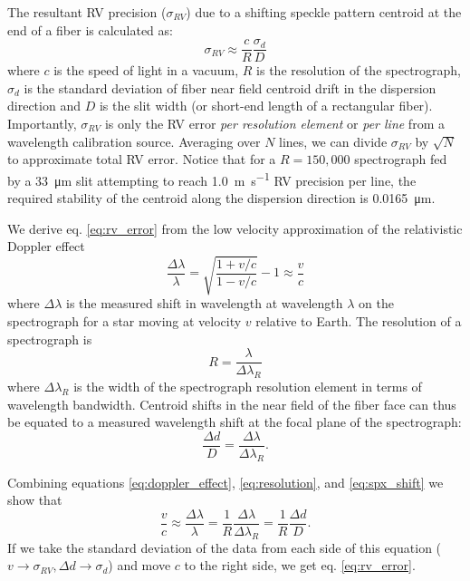 \documentclass[twocolumn]{emulateapj}
\begin{document}
The resultant RV precision ($\sigma_{RV}$) due to a shifting speckle pattern centroid at the end of a fiber is calculated as:
\begin{equation}
\sigma_{RV} \approx \frac{c}{R} \frac{\sigma_d}{D}
\label{eq:rv_error}
\end{equation}
where $c$ is the speed of light in a vacuum, $R$ is the resolution of the spectrograph, $\sigma_d$ is the standard deviation of fiber near field centroid drift in the dispersion direction and $D$ is the slit width (or short-end length of a rectangular fiber). Importantly, $\sigma_{RV}$ is only the RV error \textit{per resolution element} or \textit{per line} from a wavelength calibration source. Averaging over $N$ lines, we can divide $\sigma_{RV}$ by $\sqrt{N}$ to approximate total RV error. Notice that for a $R=150,000$ spectrograph fed by a \SI{33}{\micro\meter} slit attempting to reach \SI{1.0}{\meter\per\second} RV precision per line, the required stability of the centroid along the dispersion direction is \SI{0.0165}{\micro\meter}.

We derive eq. \ref{eq:rv_error} from the low velocity approximation of the relativistic Doppler effect
\begin{equation}
\frac{\Delta \lambda}{\lambda} = \sqrt{\frac{1 + v/c}{1-v/c}} - 1 \approx \frac{v}{c}
\label{eq:doppler_effect}
\end{equation}
where $\Delta \lambda$ is the measured shift in wavelength at wavelength $\lambda$ on the spectrograph for a star moving at velocity $v$ relative to Earth. The resolution of a spectrograph is
\begin{equation}
R = \frac{\lambda}{\Delta \lambda_R}
\label{eq:resolution}
\end{equation}
where $\Delta \lambda_R$ is the width of the spectrograph resolution element in terms of wavelength bandwidth. Centroid shifts in the near field of the fiber face can thus be equated to a measured wavelength shift at the focal plane of the spectrograph:
\begin{equation}
\frac{\Delta d}{D} = \frac{\Delta \lambda}{\Delta \lambda_R}.
\label{eq:spx_shift}
\end{equation}

Combining equations \ref{eq:doppler_effect}, \ref{eq:resolution}, and \ref{eq:spx_shift} we show that
\begin{equation}
\frac{v}{c} \approx \frac{\Delta \lambda}{\lambda} = \frac{1}{R} \frac{\Delta \lambda}{\Delta \lambda_R} = \frac{1}{R} \frac{\Delta d}{D}.
\end{equation}
If we take the standard deviation of the data from each side of this equation ($v \rightarrow \sigma_{RV}, \Delta d \rightarrow \sigma_d$) and move $c$ to the right side, we get eq. \ref{eq:rv_error}.
\end{document}
